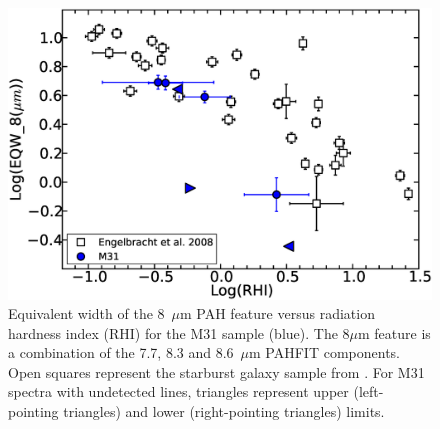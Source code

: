 \begin{figure}
\centering
\includegraphics[scale=0.25]{./englvsmy.eps}
\caption{Equivalent width of the 8~$\mu$m PAH feature versus radiation hardness index (RHI) for the M31 sample (blue). 
The 8$\mu$m feature is a combination of the 7.7, 8.3 and 8.6~$\mu$m PAHFIT components. 
Open squares represent the starburst galaxy sample from \citet{Engelbracht_2008}. 
For M31 spectra with undetected lines, triangles represent upper (left-pointing triangles) and lower (right-pointing triangles) limits.}
\label{englII}
\end{figure}

